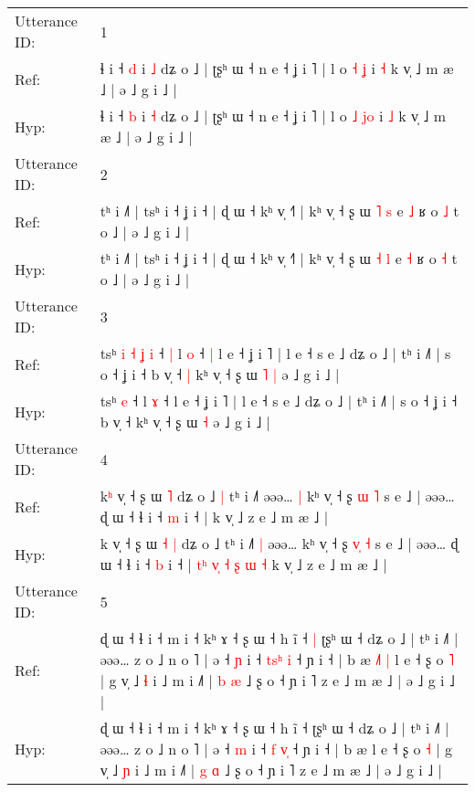 \documentclass[10pt]{article}
\DeclareRobustCommand{\hl}[1]{{\textcolor{red}{#1}}}
\begin{document}
\begin{longtable}{ll}
\toprule
Utterance ID: & 1 \\
Ref: & ɬ i ˧ \hl{d} i \hl{˩} dʑ o ˩ | ʈʂʰ ɯ ˧ n e ˧ ʝ i ˥ | l o \hl{˧} \hl{}\hl{ʝ} i \hl{˧} k v̩ ˩ m æ ˩ | ə ˩ g i ˩ |
 \\
Hyp: & ɬ i ˧ \hl{b} i \hl{˧} dʑ o ˩ | ʈʂʰ ɯ ˧ n e ˧ ʝ i ˥ | l o \hl{˩} \hl{j}\hl{o} i \hl{˩} k v̩ ˩ m æ ˩ | ə ˩ g i ˩ |
 \\
\midrule
Utterance ID: & 2 \\
Ref: & tʰ i ˩˥ | tsʰ i ˧ ʝ i ˧ | ɖ ɯ ˧ kʰ v̩ ˧˥ | kʰ v̩ ˧ ʂ ɯ \hl{˥} \hl{s} e \hl{˩} ʁ o \hl{˩} t o ˩ | ə ˩ g i ˩ |
 \\
Hyp: & tʰ i ˩˥ | tsʰ i ˧ ʝ i ˧ | ɖ ɯ ˧ kʰ v̩ ˧˥ | kʰ v̩ ˧ ʂ ɯ \hl{˧} \hl{l} e \hl{˧} ʁ o \hl{˧} t o ˩ | ə ˩ g i ˩ |
 \\
\midrule
Utterance ID: & 3 \\
Ref: & tsʰ\hl{ }\hl{i}\hl{ }\hl{˧}\hl{ }\hl{ʝ} \hl{i} ˧\hl{ }\hl{|} l \hl{o} ˧\hl{ }\hl{|} l e ˧ ʝ i ˥ | l e ˧ s e ˩ dʑ o ˩ | tʰ i ˩˥ | s o ˧ ʝ i ˧ b v̩ ˧\hl{ }\hl{|} kʰ v̩ ˧ ʂ ɯ\hl{ }\hl{˥} \hl{|} ə ˩ g i ˩ |
 \\
Hyp: & tsʰ\hl{}\hl{}\hl{}\hl{}\hl{}\hl{} \hl{e} ˧\hl{}\hl{} l \hl{ɤ} ˧\hl{}\hl{} l e ˧ ʝ i ˥ | l e ˧ s e ˩ dʑ o ˩ | tʰ i ˩˥ | s o ˧ ʝ i ˧ b v̩ ˧\hl{}\hl{} kʰ v̩ ˧ ʂ ɯ\hl{}\hl{} \hl{˧} ə ˩ g i ˩ |
 \\
\midrule
Utterance ID: & 4 \\
Ref: & k\hl{ʰ} v̩ ˧ ʂ ɯ\hl{}\hl{} \hl{˥} dʑ o ˩\hl{ }\hl{|} tʰ i ˩˥\hl{}\hl{} əəə…\hl{ }\hl{|} kʰ v̩ ˧ ʂ \hl{}\hl{ɯ} \hl{˥} s e ˩ | əəə… ɖ ɯ ˧ ɬ i ˧ \hl{m} i ˧ |\hl{}\hl{}\hl{}\hl{}\hl{}\hl{}\hl{}\hl{}\hl{}\hl{}\hl{}\hl{}\hl{}\hl{} k v̩ ˩ z e ˩ m æ ˩ |
 \\
Hyp: & k\hl{} v̩ ˧ ʂ ɯ\hl{ }\hl{˧} \hl{|} dʑ o ˩\hl{}\hl{} tʰ i ˩˥\hl{ }\hl{|} əəə…\hl{}\hl{} kʰ v̩ ˧ ʂ \hl{v}\hl{̩} \hl{˧} s e ˩ | əəə… ɖ ɯ ˧ ɬ i ˧ \hl{b} i ˧ |\hl{ }\hl{t}\hl{ʰ}\hl{ }\hl{v}\hl{̩}\hl{ }\hl{˧}\hl{ }\hl{ʂ}\hl{ }\hl{ɯ}\hl{ }\hl{˧} k v̩ ˩ z e ˩ m æ ˩ |
 \\
\midrule
Utterance ID: & 5 \\
Ref: & ɖ ɯ ˧ ɬ i ˧ m i ˧ kʰ ɤ ˧ ʂ ɯ ˧ h ĩ ˧\hl{ }\hl{|} ʈʂʰ ɯ ˧ dʑ o ˩ | tʰ i ˩˥ | əəə… z o ˩ n o ˥ | ə ˧ \hl{ɲ} i ˧ \hl{t}\hl{s}\hl{ʰ}\hl{ }\hl{i} ˧ ɲ i ˧ | b æ\hl{ }\hl{˩}\hl{˥}\hl{ }\hl{|} l e ˧ ʂ o \hl{˥} | g v̩ ˩ \hl{ɬ} i ˩ m i ˩˥ | \hl{b} \hl{æ} ˩ ʂ o ˧ ɲ i ˥ z e ˩ m æ ˩ | ə ˩ g i ˩ |
 \\
Hyp: & ɖ ɯ ˧ ɬ i ˧ m i ˧ kʰ ɤ ˧ ʂ ɯ ˧ h ĩ ˧\hl{}\hl{} ʈʂʰ ɯ ˧ dʑ o ˩ | tʰ i ˩˥ | əəə… z o ˩ n o ˥ | ə ˧ \hl{m} i ˧ \hl{}\hl{f}\hl{ }\hl{v}\hl{̩} ˧ ɲ i ˧ | b æ\hl{}\hl{}\hl{}\hl{}\hl{} l e ˧ ʂ o \hl{˧} | g v̩ ˩ \hl{ɲ} i ˩ m i ˩˥ | \hl{g} \hl{ɑ} ˩ ʂ o ˧ ɲ i ˥ z e ˩ m æ ˩ | ə ˩ g i ˩ |

\end{longtable}
\end{document}
